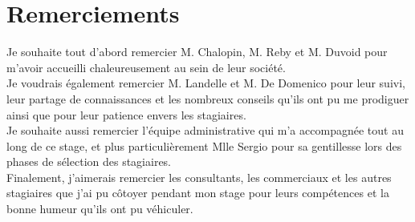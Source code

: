 \chapter*{Remerciements}

Je souhaite tout d'abord remercier M. Chalopin, M. Reby et M. Duvoid pour m'avoir accueilli chaleureusement au sein de leur société.\\

Je voudrais également remercier M. Landelle et M. De Domenico pour leur suivi, leur partage de connaissances et les nombreux conseils qu'ils ont pu me prodiguer ainsi que pour leur patience envers les stagiaires.\\

Je souhaite aussi remercier l'équipe administrative qui m'a accompagnée tout au long de ce stage, et plus particulièrement Mlle Sergio pour sa gentillesse lors des phases de sélection des stagiaires.\\

Finalement, j'aimerais remercier les consultants, les commerciaux et les autres stagiaires que j'ai pu côtoyer pendant mon stage pour leurs compétences et la bonne humeur qu'ils ont pu véhiculer.